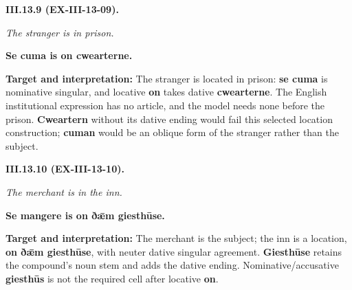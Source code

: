 \par\begin{minipage}{\linewidth}\raggedright
\textbf{III.13.9 (EX-III-13-09).}

\emph{The stranger is in prison.}

\textbf{Se cuma is on cwearterne.}

\textbf{Target and interpretation:} The stranger is located in prison: \textbf{se cuma} is nominative singular, and locative \textbf{on} takes dative \textbf{cwearterne}. The English institutional expression has no article, and the model needs none before the prison. \textbf{Cweartern} without its dative ending would fail this selected location construction; \textbf{cuman} would be an oblique form of the stranger rather than the subject.

\end{minipage}\par\addvspace{4pt}

\par\begin{minipage}{\linewidth}\raggedright
\textbf{III.13.10 (EX-III-13-10).}

\emph{The merchant is in the inn.}

\textbf{Se mangere is on ðǣm giesthūse.}

\textbf{Target and interpretation:} The merchant is the subject; the inn is a location, \textbf{on ðǣm giesthūse}, with neuter dative singular agreement. \textbf{Giesthūse} retains the compound's noun stem and adds the dative ending. Nominative/\allowbreak{}accusative \textbf{giesthūs} is not the required cell after locative \textbf{on}.

\end{minipage}\par\addvspace{4pt}

